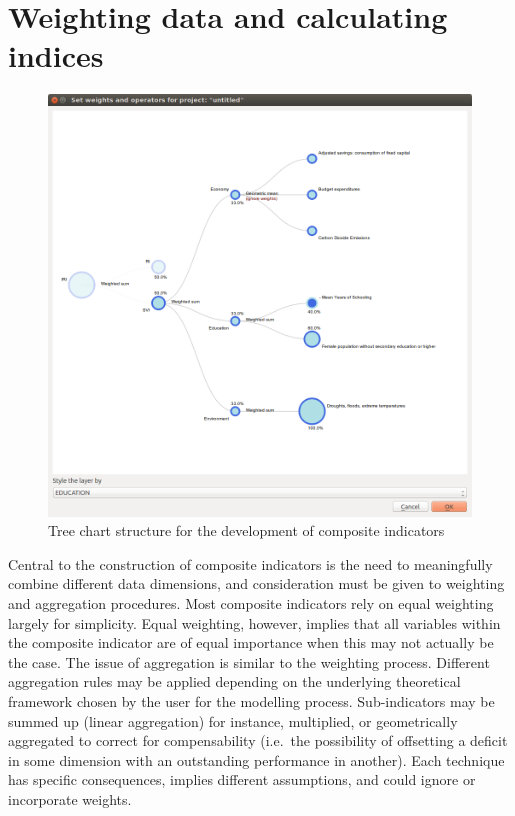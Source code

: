 \section{Weighting data and calculating indices}
\label{sec:weighting_and_calculating}

\begin{figure}
    \centering
    \includegraphics[width=\textwidth]{../images/image06}
    \caption{Tree chart structure for the development of composite indicators}
    \label{fig:weighting_and_calculating}
\end{figure}

Central to the construction of composite indicators is the need to meaningfully
combine different data dimensions, and consideration must be given to weighting
and aggregation procedures. Most composite indicators rely on equal weighting
largely for simplicity. Equal weighting, however, implies that all variables
within the composite indicator are of equal importance when this may not
actually be the case. The issue of aggregation is similar to the weighting
process. Different aggregation rules may be applied depending on the underlying
theoretical framework chosen by the user for the modelling process.
Sub-indicators may be summed up (linear aggregation) for instance, multiplied,
or geometrically aggregated to correct for compensability (i.e.\ the possibility
of offsetting a deficit in some dimension with an outstanding performance in
another). Each technique has specific consequences, implies different
assumptions, and could ignore or incorporate weights.

